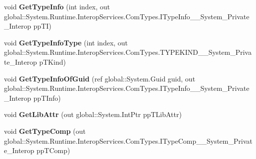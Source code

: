 \begin{DoxyCompactItemize}
void {\bfseries Get\+Type\+Info} (int index, out global\+::\+System.\+Runtime.\+Interop\+Services.\+Com\+Types.\+I\+Type\+Info\+\_\+\+\_\+\+System\+\_\+\+Private\+\_\+\+Interop pp\+TI)
\item 
\mbox{\label{interface_system_1_1_runtime_1_1_interop_services_1_1_com_types_1_1_i_type_lib_____system___private___interop_a986454fa9fc37dfd64ab594c0fc42232}} 
void {\bfseries Get\+Type\+Info\+Type} (int index, out global\+::\+System.\+Runtime.\+Interop\+Services.\+Com\+Types.\+T\+Y\+P\+E\+K\+I\+N\+D\+\_\+\+\_\+\+System\+\_\+\+Private\+\_\+\+Interop p\+T\+Kind)
\item 
\mbox{\label{interface_system_1_1_runtime_1_1_interop_services_1_1_com_types_1_1_i_type_lib_____system___private___interop_a29c3f76d3f2e6750db6203a42ad93a69}} 
void {\bfseries Get\+Type\+Info\+Of\+Guid} (ref global\+::\+System.\+Guid guid, out global\+::\+System.\+Runtime.\+Interop\+Services.\+Com\+Types.\+I\+Type\+Info\+\_\+\+\_\+\+System\+\_\+\+Private\+\_\+\+Interop pp\+T\+Info)
\item 
\mbox{\label{interface_system_1_1_runtime_1_1_interop_services_1_1_com_types_1_1_i_type_lib_____system___private___interop_ac1b35c8576242797a74466d7999c3d30}} 
void {\bfseries Get\+Lib\+Attr} (out global\+::\+System.\+Int\+Ptr pp\+T\+Lib\+Attr)
\item 
\mbox{\label{interface_system_1_1_runtime_1_1_interop_services_1_1_com_types_1_1_i_type_lib_____system___private___interop_a1ec943ec9b2d14dd70c3367706164a45}} 
void {\bfseries Get\+Type\+Comp} (out global\+::\+System.\+Runtime.\+Interop\+Services.\+Com\+Types.\+I\+Type\+Comp\+\_\+\+\_\+\+System\+\_\+\+Private\+\_\+\+Interop pp\+T\+Comp)
\item 
\mbox{\label{interface_system_1_1_runtime_1_1_interop_services_1_1_com_types_1_1_i_type_lib_____system___private___interop_aff9e8eca4346610e25643d0f21d2bb4f}} 

\end{DoxyCompactItemize}
